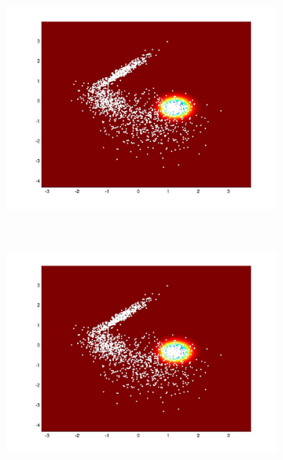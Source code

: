 \documentclass[useAMS,usenatbib,fleqn]{mn2e}
\begin{document}
\begin{figure}
        \centering
        \begin{subfigure}[b]{70 px}
                \includegraphics[trim = 150px 100px 150px 70px, clip=true,width=\textwidth]{global1.jpg}
        \end{subfigure}
        ~
         \begin{subfigure}[b]{70 px}
                \includegraphics[trim = 150px 100px 150px 70px, clip=true,width=\textwidth]{VL1.jpg}
        \end{subfigure}
        ~
        \begin{subfigure}[b]{70 px}

\end{subfigure}
\end{figure}
\end{document}
